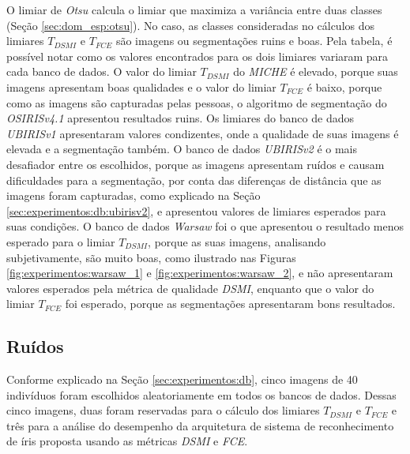 \par O limiar de \textit{Otsu} calcula o limiar que maximiza a variância entre duas classes (Seção \ref{sec:dom_esp:otsu}). No caso, as classes consideradas no cálculos dos limiares $T_{DSMI}$ e $T_{FCE}$ são imagens ou segmentações ruins e boas. Pela tabela, é possível notar como os valores encontrados para os dois limiares variaram para cada banco de dados. O valor do limiar $T_{DSMI}$  do \textit{MICHE} é elevado, porque suas imagens apresentam boas qualidades e o valor do limiar $T_{FCE}$ é baixo, porque como as imagens são capturadas pelas pessoas, o algoritmo de segmentação do \textit{OSIRISv4.1} apresentou resultados ruins. Os limiares do banco de dados \textit{UBIRISv1} apresentaram valores condizentes, onde a qualidade de suas imagens é elevada e a segmentação também. O banco de dados \textit{UBIRISv2} é o mais desafiador entre os escolhidos, porque as imagens apresentam ruídos e causam dificuldades para a segmentação, por conta das diferenças de distância que as imagens foram capturadas, como explicado na Seção \ref{sec:experimentos:db:ubirisv2}, e apresentou valores de limiares esperados para suas condições. O banco de dados \textit{\acrshort{Warsaw}} foi o que apresentou o resultado menos esperado para o limiar $T_{DSMI}$, porque as suas imagens, analisando subjetivamente, são muito boas, como ilustrado nas Figuras \ref{fig:experimentos:warsaw_1} e \ref{fig:experimentos:warsaw_2}, e não apresentaram valores esperados pela métrica de qualidade \textit{\acrshort{DSMI}}, enquanto que o valor do limiar $T_{FCE}$ foi esperado, porque as segmentações apresentaram bons resultados.

\FloatBarrier

\subsection{Ruídos} \label{sec:experimentos:ruidos}

\par Conforme explicado na Seção \ref{sec:experimentos:db}, cinco imagens de 40 indivíduos foram escolhidos aleatoriamente em todos os bancos de dados. Dessas cinco imagens, duas foram reservadas para o cálculo dos limiares $T_{DSMI}$ e $T_{FCE}$ e três para a análise do desempenho da arquitetura de sistema de reconhecimento de íris proposta usando as métricas \textit{\acrshort{DSMI}} e \textit{\acrshort{FCE}}. 

